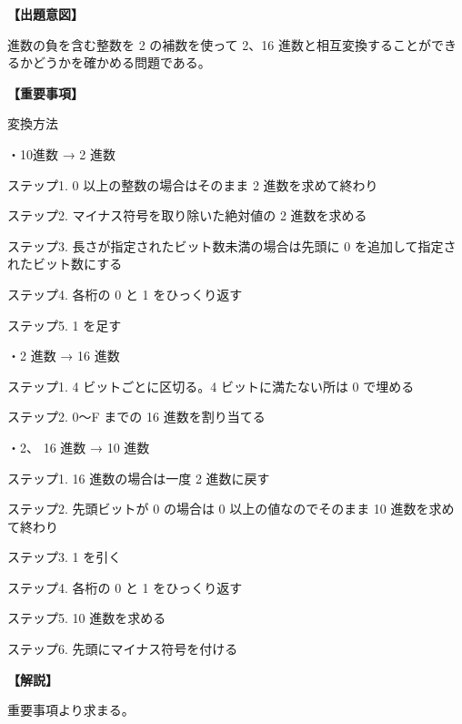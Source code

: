 \noindent \textbf{【出題意図】}

 進数の負を含む整数を 2 の補数を使って 2、16 進数と相互変換することができるかどうかを確かめる問題である。

\vspace{1em}
\noindent \textbf{【重要事項】}

\noindent 変換方法

\medskip
\noindent ・10進数 → 2 進数

\noindent ステップ1.  0 以上の整数の場合はそのまま 2 進数を求めて終わり

\noindent ステップ2.  マイナス符号を取り除いた絶対値の 2 進数を求める 

\noindent ステップ3.  長さが指定されたビット数未満の場合は先頭に 0 を追加して指定されたビット数にする 

\noindent ステップ4.  各桁の 0 と 1 をひっくり返す 

\noindent ステップ5.  1 を足す 


\medskip
\noindent ・2 進数 → 16 進数

\noindent ステップ1. 4  ビットごとに区切る。4 ビットに満たない所は 0 で埋める

\noindent ステップ2.  0〜F までの 16 進数を割り当てる

\medskip
\noindent ・2、 16 進数 → 10 進数

\noindent ステップ1.  16 進数の場合は一度 2 進数に戻す

\noindent ステップ2.  先頭ビットが 0 の場合は 0 以上の値なのでそのまま 10 進数を求めて終わり

\noindent ステップ3.  1 を引く

\noindent ステップ4.  各桁の 0 と 1 をひっくり返す

\noindent ステップ5.  10 進数を求める

\noindent ステップ6.  先頭にマイナス符号を付ける


\vspace{1em}
\noindent \textbf{【解説】}

\noindent 重要事項より求まる。
